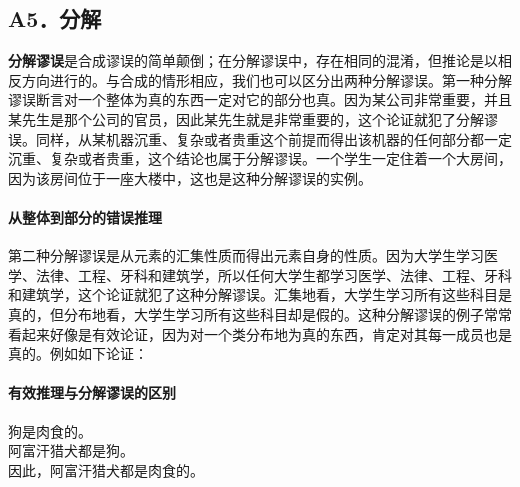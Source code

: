 \subsection{A5．分解}

\textbf{分解谬误}是合成谬误的简单颠倒；在分解谬误中，存在相同的混淆，但推论是以相反方向进行的。与合成的情形相应，我们也可以区分出两种分解谬误。第一种分解谬误断言对一个整体为真的东西一定对它的部分也真。因为某公司非常重要，并且某先生是那个公司的官员，因此某先生就是非常重要的，这个论证就犯了分解谬误。同样，从某机器沉重、复杂或者贵重这个前提而得出该机器的任何部分都一定沉重、复杂或者贵重，这个结论也属于分解谬误。一个学生一定住着一个大房间，因为该房间位于一座大楼中，这也是这种分解谬误的实例。

\paragraph{从整体到部分的错误推理}
第二种分解谬误是从元素的汇集性质而得出元素自身的性质。因为大学生学习医学、法律、工程、牙科和建筑学，所以任何大学生都学习医学、法律、工程、牙科和建筑学，这个论证就犯了这种分解谬误。汇集地看，大学生学习所有这些科目是真的，但分布地看，大学生学习所有这些科目却是假的。这种分解谬误的例子常常看起来好像是有效论证，因为对一个类分布地为真的东西，肯定对其每一成员也是真的。例如如下论证：

\paragraph{有效推理与分解谬误的区别}
狗是肉食的。\\
阿富汗猎犬都是狗。\\
因此，阿富汗猎犬都是肉食的。 